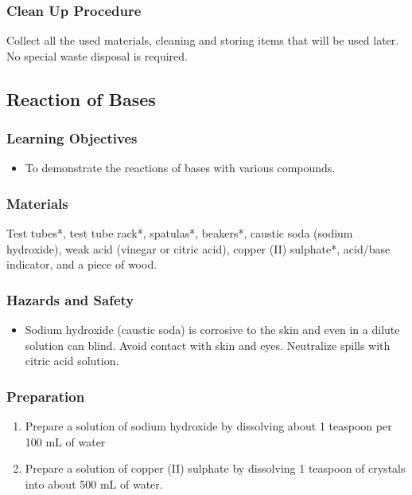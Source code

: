 \subsubsection*{Clean Up Procedure}
Collect all the used materials, cleaning and storing items that will be used later.  No special waste disposal is required.

\subsection{Reaction of Bases}

\subsubsection*{Learning Objectives}
\begin{itemize}
\item{To demonstrate the reactions of bases with various compounds}.
\end{itemize}

\subsubsection*{Materials}
Test tubes*, test tube rack*, spatulas*, beakers*, caustic soda (sodium hydroxide), weak acid (vinegar or citric acid), copper (II) sulphate*, acid/base indicator, and a piece of wood.

\subsubsection*{Hazards and Safety}
\begin{itemize}
\item{Sodium hydroxide (caustic soda) is corrosive to the skin and even in a dilute solution can blind. Avoid contact with skin and eyes. Neutralize spills with citric acid solution.}
\end{itemize}

\subsubsection*{Preparation}
\begin{enumerate}
\item{Prepare a solution of sodium hydroxide by dissolving about 1 teaspoon per 100 mL of water}
\item{Prepare a solution of copper (II) sulphate by dissolving 1 teaspoon of crystals into about 500 mL of water.}
\end{enumerate}

